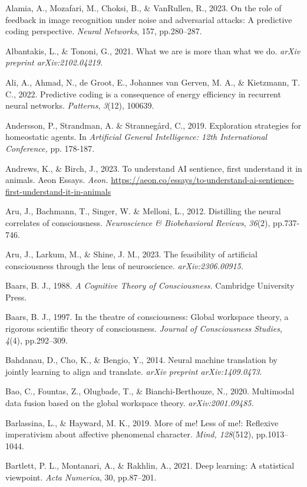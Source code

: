 \documentclass[12pt]{article}
\begin{document}
Alamia, A., Mozafari, M., Choksi, B., \& VanRullen, R., 2023. On the
role of feedback in image recognition under noise and adversarial
attacks: A predictive coding perspective. \emph{Neural Networks}, 157,
pp.280--287.

Albantakis, L., \& Tononi, G., 2021. What we are is more than what we
do. \emph{arXiv preprint arXiv:2102.04219.}

Ali, A., Ahmad, N., de Groot, E., Johannes van Gerven, M. A., \&
Kietzmann, T. C., 2022. Predictive coding is a consequence of energy
efficiency in recurrent neural networks. \emph{Patterns}, \emph{3}(12),
100639.

Andersson, P., Strandman, A. \& Strannegård, C., 2019. Exploration
strategies for homeostatic agents. In \emph{Artificial General
Intelligence: 12th International Conference,} pp. 178-187.

Andrews, K., \& Birch, J., 2023. To understand AI sentience, first
understand it in animals. Aeon Essays. \emph{Aeon.}
\href{https://aeon.co/essays/to-understand-ai-sentience-first-understand-it-in-animals}{https://aeon.co/essays/to-understand-ai-sentience-first-understand-it-in-animals}

Aru, J., Bachmann, T., Singer, W. \& Melloni, L., 2012. Distilling the
neural correlates of consciousness. \emph{Neuroscience \& Biobehavioral
Reviews}, \emph{36}(2), pp.737-746.

Aru, J., Larkum, M., \& Shine, J. M., 2023. The feasibility of
artificial consciousness through the lens of neuroscience.
\emph{arXiv:2306.00915.}

Baars, B. J., 1988. \emph{A Cognitive Theory of Consciousness.}
Cambridge University Press.

Baars, B. J., 1997. In the theatre of consciousness: Global workspace
theory, a rigorous scientific theory of consciousness. \emph{Journal of
Consciousness Studies, 4}(4), pp.292--309.

Bahdanau, D., Cho, K., \& Bengio, Y., 2014. Neural machine translation
by jointly learning to align and translate. \emph{arXiv preprint
arXiv:1409.0473}.

Bao, C., Fountas, Z., Olugbade, T., \& Bianchi-Berthouze, N., 2020.
Multimodal data fusion based on the global workspace theory.
\emph{arXiv:2001.09485.}

Barlassina, L., \& Hayward, M. K., 2019. More of me! Less of me!:
Reflexive imperativism about affective phenomenal character. \emph{Mind,
128}(512), pp.1013--1044.

Bartlett, P. L., Montanari, A., \& Rakhlin, A., 2021. Deep learning: A
statistical viewpoint. \emph{Acta Numerica}, 30, pp.87--201.
\end{document}
